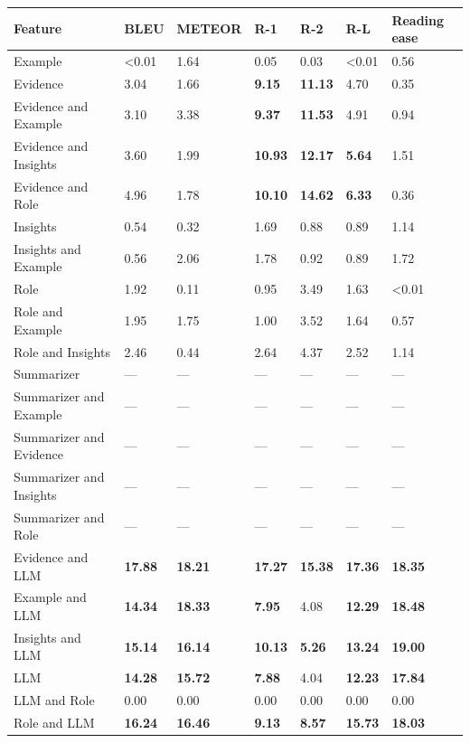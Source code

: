 \begin{tabular}{|l|l|l|l|l|l|l|}
\hline
\textbf{Feature} & BLEU & METEOR & R-1 & R-2 & R-L & Reading ease \\
 \hline
 Example & \textless{}0.01 & 1.64 & 0.05 & 0.03 & \textless{}0.01 & 0.56 \\
 \hline
 Evidence & 3.04 & 1.66 & \textbf{9.15} & \textbf{11.13} & 4.70 & 0.35 \\
 \hline
 Evidence and Example & 3.10 & 3.38 & \textbf{9.37} & \textbf{11.53} & 4.91 & 0.94 \\
 \hline
 Evidence and Insights & 3.60 & 1.99 & \textbf{10.93} & \textbf{12.17} & \textbf{5.64} & 1.51 \\
 \hline
 Evidence and Role & 4.96 & 1.78 & \textbf{10.10} & \textbf{14.62} & \textbf{6.33} & 0.36 \\
 \hline
 Insights & 0.54 & 0.32 & 1.69 & 0.88 & 0.89 & 1.14 \\
 \hline
 Insights and Example & 0.56 & 2.06 & 1.78 & 0.92 & 0.89 & 1.72 \\
 \hline
 Role & 1.92 & 0.11 & 0.95 & 3.49 & 1.63 & \textless{}0.01 \\
 \hline
 Role and Example & 1.95 & 1.75 & 1.00 & 3.52 & 1.64 & 0.57 \\
 \hline
 Role and Insights & 2.46 & 0.44 & 2.64 & 4.37 & 2.52 & 1.14 \\
 \hline
 Summarizer & — & — & — & — & — & — \\
 \hline
 Summarizer and Example & — & — & — & — & — & — \\
 \hline
 Summarizer and Evidence & — & — & — & — & — & — \\
 \hline
 Summarizer and Insights & — & — & — & — & — & — \\
 \hline
 Summarizer and Role & — & — & — & — & — & — \\
 \hline
 Evidence and LLM & \textbf{17.88} & \textbf{18.21} & \textbf{17.27} & \textbf{15.38} & \textbf{17.36} & \textbf{18.35} \\
 \hline
 Example and LLM & \textbf{14.34} & \textbf{18.33} & \textbf{7.95} & 4.08 & \textbf{12.29} & \textbf{18.48} \\
 \hline
 Insights and LLM & \textbf{15.14} & \textbf{16.14} & \textbf{10.13} & \textbf{5.26} & \textbf{13.24} & \textbf{19.00} \\
 \hline
 LLM & \textbf{14.28} & \textbf{15.72} & \textbf{7.88} & 4.04 & \textbf{12.23} & \textbf{17.84} \\
 \hline
 LLM and Role & 0.00 & 0.00 & 0.00 & 0.00 & 0.00 & 0.00 \\
 \hline
 Role and LLM & \textbf{16.24} & \textbf{16.46} & \textbf{9.13} & \textbf{8.57} & \textbf{15.73} & \textbf{18.03} \\
\hline
\end{tabular}
